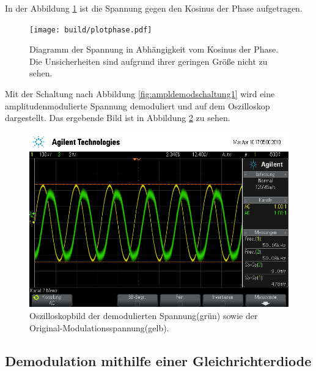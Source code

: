 In der Abbildung \ref{fig:plotphase} ist die Spannung gegen den Kosinus der Phase aufgetragen.

\begin{figure}
  \centering
  \texttt{[image: build/plotphase.pdf]}
  \caption{Diagramm der Spannung in Abhängigkeit vom Kosinus der Phase. Die Unsicherheiten sind aufgrund ihrer geringen Größe nicht zu sehen.}
  \label{fig:plotphase}
\end{figure}

Mit der Schaltung nach Abbildung \ref{fig:ampldemodschaltung1} wird eine amplitudenmodulierte Spannung demoduliert und auf dem Oszilloskop dargestellt. Das ergebende Bild ist in Abbildung \ref{fig:demodRing} zu sehen.

\begin{figure}[h]
  \centering
  \includegraphics[width=.9\textwidth]{Oszi_Pics/demodRing.png}
  \caption{Oszilloskopbild der demodulierten Spannung(grün) sowie der Original-Modulationsspannung(gelb).}
  \label{fig:demodRing}
\end{figure}

\subsection{Demodulation mithilfe einer Gleichrichterdiode}

